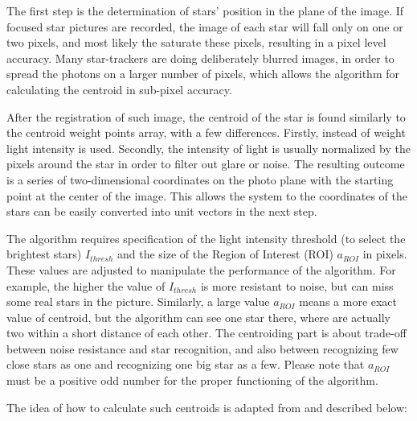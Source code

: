 \documentclass[12pt,a4paper,oneside]{article}
\begin{document}
The first step is the determination of stars' position in the plane of the image. If focused star pictures are recorded, the image of each star will fall only on one or two pixels, and most likely the saturate these pixels, resulting in a pixel level accuracy.
Many star-trackers are doing deliberately blurred images, in order to spread the photons on a larger number of pixels, which allows the algorithm for calculating the centroid in sub-pixel accuracy.

After the registration of such image, the centroid of the star is found similarly to the centroid weight points array, with a few differences. Firstly, instead of weight light intensity is used. Secondly, the intensity of light is usually normalized by the pixels around the star in order to filter out glare or noise. The resulting outcome is a series of two-dimensional coordinates on the photo plane with the starting point at the center of the image. This allows the system to the coordinates of the stars can be easily converted into unit vectors in the next step.

The algorithm requires specification of the light intensity threshold (to select the brightest stars) $I_{thresh}$ and the size of the Region of Interest (ROI) $a_{ROI}$ in pixels. These values are adjusted to manipulate the performance of the algorithm. For example, the higher the value of $I_{thresh}$ is more resistant to noise, but can miss some real stars in the picture. Similarly, a large value $a_{ROI}$ means a more exact value of centroid, but the algorithm can see one star there, where are actually two within a short distance of each other. The centroiding part is about trade-off between noise resistance and star recognition, and also between recognizing few close stars as one and recognizing one big star as a few.
Please note that $a_{ROI}$ must be a positive odd number for the proper functioning of the algorithm.


The idea of how to calculate such centroids is adapted from \citet{mcbryde2012star} and described below:
\end{document}
